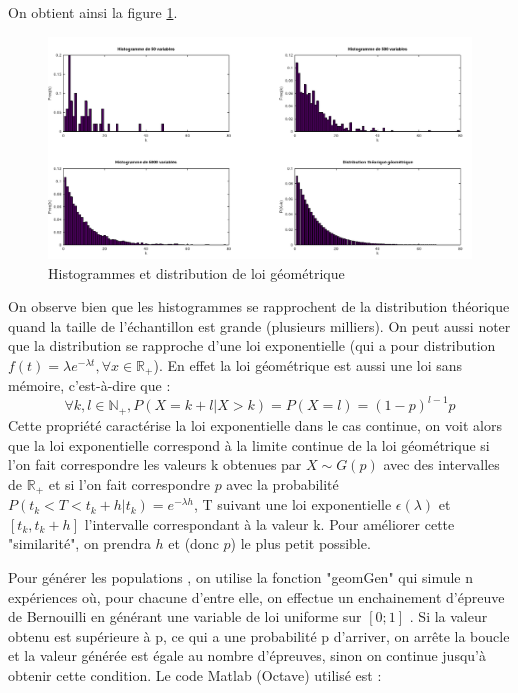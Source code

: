 \documentclass[12pt,a4paper,titlepage]{article}
\numberwithin{equation}{section}
\begin{document}


On obtient ainsi la figure \ref{Histogrammes et distribution de loi géométrique}.

\begin{figure}[!h]
\begin{center}
 \includegraphics[scale=0.4]{images/histGeom.png} 
\end{center}
 \caption{Histogrammes et distribution de loi géométrique}
 \label{Histogrammes et distribution de loi géométrique}
\end{figure}

On observe bien que les histogrammes se rapprochent de la distribution théorique quand
la taille de l'échantillon est grande (plusieurs milliers). On peut aussi noter que la distribution
se rapproche d'une loi exponentielle (qui a pour distribution $f(t)=\lambda e^{-\lambda t}, \forall x \in \mathbb{R}_{+}$). En effet la loi géométrique est aussi une loi sans mémoire, c'est-à-dire que :
\[\forall k,l \in \mathbb{N}_{+}, P(X=k+l|X>k) = P(X=l) = (1-p)^{l-1}p \]
Cette propriété caractérise la loi exponentielle dans le cas continue, on voit alors que la loi exponentielle correspond à la limite continue de la loi géométrique si l'on fait correspondre les valeurs k obtenues par $X\sim G(p)$ avec des intervalles de  $\mathbb{R}_{+}$ et si l'on fait correspondre $p$ avec la probabilité $P(t_{k}<T<t_{k}+h|t_{k})=e^{-\lambda h}$, T suivant une loi exponentielle $\epsilon(\lambda)$ et $[t_{k},t_{k}+h]$ l'intervalle correspondant à la valeur k. Pour améliorer cette "similarité", on prendra $h$ et (donc $p$) le plus petit possible.

Pour générer les populations , on utilise la fonction "geomGen" qui simule
n expériences où, pour chacune d'entre elle, on effectue un enchainement
d'épreuve de Bernouilli en générant une variable de loi uniforme sur
$[0;1]$ . Si la valeur obtenu est supérieure à p, ce qui a une probabilité p d'arriver, on arrête la boucle
et la valeur générée est égale au nombre d'épreuves, sinon on continue 
jusqu'à obtenir cette condition. Le code Matlab (Octave) utilisé est :
\end{document}
